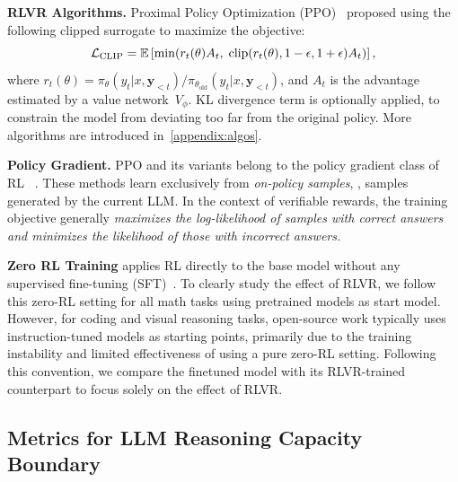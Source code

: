 \textbf{RLVR Algorithms.} 
Proximal Policy Optimization (PPO)~\cite{schulman2017ppo} proposed using the following clipped surrogate to maximize the objective:
\begin{equation}
\setlength\abovedisplayskip{2pt}
\setlength\belowdisplayskip{2pt}
\mathcal{L}_{\text{CLIP}} =
\mathbb{E} \left[
\min\!\left(
r_t(\theta) A_t,\;
\operatorname{clip}(r_t(\theta), 1 - \epsilon, 1 + \epsilon) A_t
\right)
\right],
\end{equation}
where $r_t(\theta) =
\pi_{\theta}(y_t | x, \mathbf{y}_{<t}) /
\pi_{\theta_{\text{old}}}(y_t |  x, \mathbf{y}_{<t})$,
and $A_t$ is the advantage estimated by a value network~$V_{\phi}$. 
KL divergence term is optionally applied, 
to constrain the model from deviating too far from the original policy.
More algorithms are introduced in~\cref{appendix:algos}.

\textbf{Policy Gradient.}  
PPO and its variants belong to the policy gradient class of RL ~\cite{williams1992reinforce,sutton1998reinforcement}. These methods learn exclusively from \textit{on-policy samples}, \ie, samples generated by the current LLM.  
In the context of verifiable rewards, the training objective generally \textit{maximizes the log-likelihood of samples with correct answers and minimizes the likelihood of those with incorrect answers.}


\textbf{Zero RL Training} applies RL directly to the base model without any supervised fine-tuning (SFT)~\cite{guo2025deepseek-r1}.
To clearly study the effect of RLVR, we follow this zero-RL setting for all math tasks using pretrained models as start model.
However, for coding and visual reasoning tasks, open-source work typically uses instruction-tuned models as starting points, primarily due to the training instability and limited effectiveness of using a pure zero-RL setting.
Following this convention, we compare the finetuned model with its RLVR-trained counterpart to focus solely on the effect of RLVR.

\vspace{-1.5mm}
\subsection{Metrics for LLM Reasoning Capacity Boundary}
\vspace{-1.5mm}

